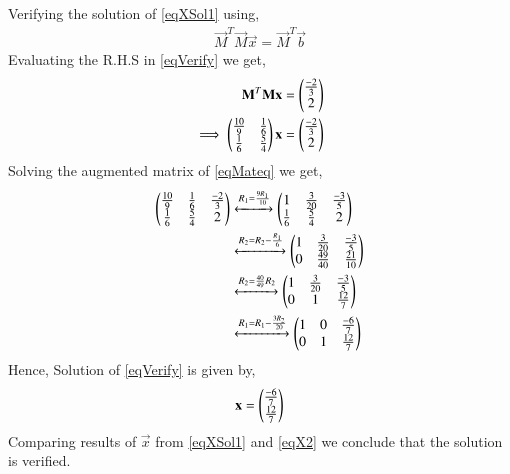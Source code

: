 \documentclass[journal,12pt,twocolumn]{IEEEtran}
\begin{document}
Verifying the solution of \eqref{eqXSol1} using,
\begin{align}
\vec{M}^T\vec{M}\vec{x} = \vec{M}^T\vec{b}\label{eqVerify}
\end{align}
Evaluating the R.H.S in \eqref{eqVerify} we get,
\begin{align}
\mathbf{M}^T\mathbf{M}\mathbf{x} &= \begin{pmatrix}\frac{-2}{3}\\ 2\end{pmatrix}\\
\implies\begin{pmatrix}\frac{10}{9}&\frac{1}{6}\\\frac{1}{6}&\frac{5}{4}\end{pmatrix}\mathbf{x} &= \begin{pmatrix}\frac{-2}{3}\\2\end{pmatrix}\label{eqMateq}
\end{align}
Solving the augmented matrix of \eqref{eqMateq} we get,
\begin{align}
\begin{pmatrix}\frac{10}{9}&\frac{1}{6}& \frac{-2}{3}\\\frac{1}{6}&\frac{5}{4}& 2\end{pmatrix} &\xleftrightarrow{R_1=\frac{9R_1}{10}}\begin{pmatrix}1&\frac{3}{20}&\frac{-3}{5}\\\frac{1}{6}&\frac{5}{4}&2\end{pmatrix}\\
&\xleftrightarrow{R_2=R_2-\frac{R_1}{6}}\begin{pmatrix}1&\frac{3}{20}&\frac{-3}{5}\\0&\frac{49}{40}&\frac{21}{10}\end{pmatrix}\\
&\xleftrightarrow{R_2=\frac{40}{49}R_2}\begin{pmatrix}1&\frac{3}{20}&\frac{-3}{5}\\0&1&\frac{12}{7}\end{pmatrix}\\
&\xleftrightarrow{R_1=R_1-\frac{3R_2}{20}}\begin{pmatrix}1&0&\frac{-6}{7}\\0&1&\frac{12}{7}\end{pmatrix}
\end{align}
Hence, Solution of \eqref{eqVerify} is given by,
\begin{align}
\mathbf{x}=\begin{pmatrix}\frac{-6}{7}\\\frac{12}{7}\end{pmatrix}\label{eqX2}
\end{align}
Comparing results of $\vec{x}$ from \eqref{eqXSol1} and \eqref{eqX2} we conclude that the solution is verified.
\end{document}
